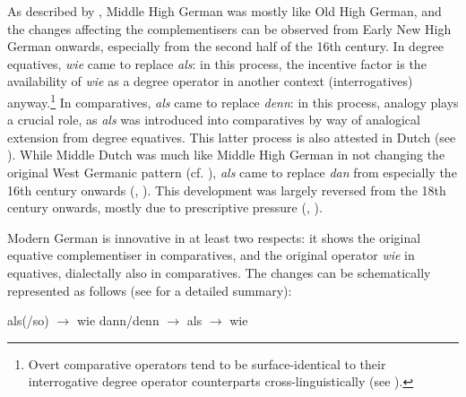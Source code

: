 As described by \citet[471--475]{jaeger2010}, Middle High German was mostly like Old High German, and the changes affecting the complementisers can be observed from Early New High German onwards, especially from the second half of the 16th century. In degree equatives, \textit{wie} came to replace \textit{als}: in this process, the incentive factor is the availability of \textit{wie} as a degree operator in another context (interrogatives) anyway.\footnote{Overt comparative operators tend to be surface-identical to their interrogative degree operator counterparts cross-linguistically (see \citealt[90--100]{bacskaiatkari2018langsci}).} In comparatives, \textit{als} came to replace \textit{denn}: in this process, analogy plays a crucial role, as \textit{als} was introduced into comparatives by way of analogical extension from degree equatives. This latter process is also attested in Dutch (see \citealt[377]{jaeger2018}). While Middle Dutch was much like Middle High German in not changing the original West Germanic pattern (cf. \citealt{postma2006}), \textit{als} came to replace \textit{dan} from especially the 16th century onwards (\citealt{vanderhorst2008deel1}, \citealt{postma2006}). This development was largely reversed from the 18th century onwards, mostly due to prescriptive pressure (\citealt{vanderhorst2008deel1}, \citealt{hubersdehoop2013}).

Modern German is innovative in at least two respects: it shows the original equative complementiser in comparatives, and the original operator \textit{wie} in equatives, dialectally also in comparatives. The changes can be schematically represented as follows (see \citealt[364, ex. 596]{jaeger2018} for a detailed summary):

\ea 
\ea als(/so)  $\rightarrow$ wie 
\ex dann/denn $\rightarrow$ als $\rightarrow$ wie
\z
\z

